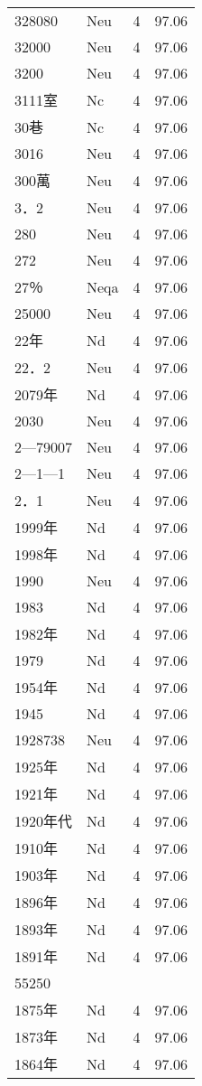 \documentclass[twocolumn]{book}
\begin{document}
\begin{supertabular}{llrr}
328080 & Neu & 4 &  97.06\\
32000 & Neu & 4 &  97.06\\
3200 & Neu & 4 &  97.06\\
3111室 & Nc & 4 &  97.06\\
30巷 & Nc & 4 &  97.06\\
3016 & Neu & 4 &  97.06\\
300萬 & Neu & 4 &  97.06\\
3．2 & Neu & 4 &  97.06\\
280 & Neu & 4 &  97.06\\
272 & Neu & 4 &  97.06\\
27％ & Neqa & 4 &  97.06\\
25000 & Neu & 4 &  97.06\\
22年 & Nd & 4 &  97.06\\
22．2 & Neu & 4 &  97.06\\
2079年 & Nd & 4 &  97.06\\
2030 & Neu & 4 &  97.06\\
2—79007 & Neu & 4 &  97.06\\
2—1—1 & Neu & 4 &  97.06\\
2．1 & Neu & 4 &  97.06\\
1999年 & Nd & 4 &  97.06\\
1998年 & Nd & 4 &  97.06\\
1990 & Neu & 4 &  97.06\\
1983 & Nd & 4 &  97.06\\
1982年 & Nd & 4 &  97.06\\
1979 & Nd & 4 &  97.06\\
1954年 & Nd & 4 &  97.06\\
1945 & Nd & 4 &  97.06\\
1928738 & Neu & 4 &  97.06\\
1925年 & Nd & 4 &  97.06\\
1921年 & Nd & 4 &  97.06\\
1920年代 & Nd & 4 &  97.06\\
1910年 & Nd & 4 &  97.06\\
1903年 & Nd & 4 &  97.06\\
1896年 & Nd & 4 &  97.06\\
1893年 & Nd & 4 &  97.06\\
1891年 & Nd & 4 &  97.06\\
55250\\
1875年 & Nd & 4 &  97.06\\
1873年 & Nd & 4 &  97.06\\
1864年 & Nd & 4 &  97.06\\

\end{supertabular}
\end{document}
